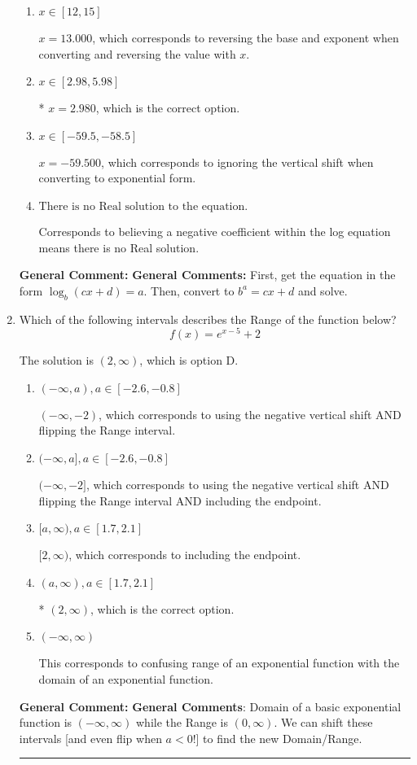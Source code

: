 \documentclass{extbook}[14pt]
\newcommand{\litem}[1]{\item #1

\rule{\textwidth}{0.4pt}}
\begin{document}
\begin{enumerate}
{\begin{enumerate}[label=\Alph*.]
$x = 19.000$, which corresponds to reversing the base and exponent when converting.
\item \( x \in [12, 15] \)

$x = 13.000$, which corresponds to reversing the base and exponent when converting and reversing the value with $x$.
\item \( x \in [2.98, 5.98] \)

* $x = 2.980$, which is the correct option.
\item \( x \in [-59.5, -58.5] \)

$x = -59.500$, which corresponds to ignoring the vertical shift when converting to exponential form.
\item \( \text{There is no Real solution to the equation.} \)

Corresponds to believing a negative coefficient within the log equation means there is no Real solution.
\end{enumerate}

\textbf{General Comment:} \textbf{General Comments:} First, get the equation in the form $\log_b{(cx+d)} = a$. Then, convert to $b^a = cx+d$ and solve.
}
\litem{
Which of the following intervals describes the Range of the function below?
\[ f(x) = e^{x-5}+2 \]

The solution is \( (2, \infty) \), which is option D.\begin{enumerate}[label=\Alph*.]
\item \( (-\infty, a), a \in [-2.6, -0.8] \)

$(-\infty, -2)$, which corresponds to using the negative vertical shift AND flipping the Range interval.
\item \( (-\infty, a], a \in [-2.6, -0.8] \)

$(-\infty, -2]$, which corresponds to using the negative vertical shift AND flipping the Range interval AND including the endpoint.
\item \( [a, \infty), a \in [1.7, 2.1] \)

$[2, \infty)$, which corresponds to including the endpoint.
\item \( (a, \infty), a \in [1.7, 2.1] \)

* $(2, \infty)$, which is the correct option.
\item \( (-\infty, \infty) \)

This corresponds to confusing range of an exponential function with the domain of an exponential function.
\end{enumerate}

\textbf{General Comment:} \textbf{General Comments}: Domain of a basic exponential function is $(-\infty, \infty)$ while the Range is $(0, \infty)$. We can shift these intervals [and even flip when $a<0$!] to find the new Domain/Range.
}
\end{enumerate}
\end{document}
